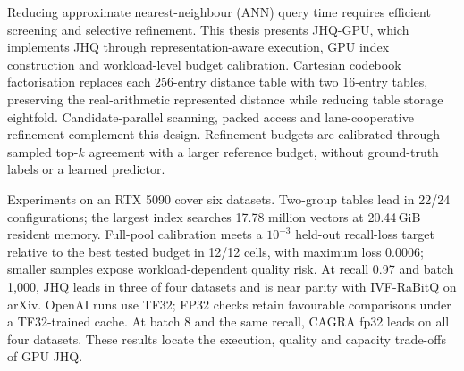 Reducing approximate nearest-neighbour (ANN) query time requires efficient
screening and selective refinement. This thesis presents JHQ-GPU, which
implements JHQ through representation-aware execution, GPU index construction
and workload-level budget calibration. Cartesian codebook factorisation
replaces each 256-entry distance table with two 16-entry tables, preserving
the real-arithmetic represented distance while reducing table storage
eightfold. Candidate-parallel scanning, packed access and lane-cooperative
refinement complement this design. Refinement budgets are calibrated through
sampled top-$k$ agreement with a larger reference budget, without ground-truth
labels or a learned predictor.

Experiments on an RTX 5090 cover six datasets. Two-group tables lead in
22/24 configurations; the largest index searches 17.78 million vectors at
20.44\,GiB resident memory. Full-pool calibration meets a $10^{-3}$ held-out
recall-loss target relative to the best tested budget in 12/12 cells, with
maximum loss 0.0006; smaller samples expose workload-dependent quality risk.
At recall 0.97 and batch 1,000, JHQ leads in three of four datasets and is
near parity with IVF-RaBitQ on arXiv. OpenAI runs use TF32; FP32 checks
retain favourable comparisons under a TF32-trained cache. At batch 8 and
the same recall, CAGRA fp32 leads on all four datasets. These results
locate the execution, quality and capacity trade-offs of GPU JHQ.
